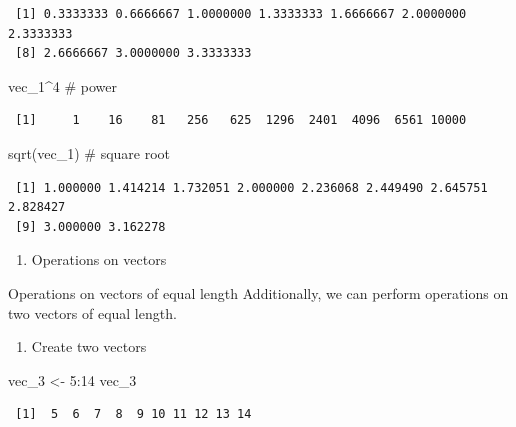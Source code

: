 \documentclass[
  letterpaper,
  DIV=11,
  numbers=noendperiod]{scrreprt}
\newenvironment{Shaded}{\begin{snugshade}}{\end{snugshade}}
\newcommand{\CommentTok}[1]{\textcolor[rgb]{0.37,0.37,0.37}{#1}}
\newcommand{\DecValTok}[1]{\textcolor[rgb]{0.68,0.00,0.00}{#1}}
\newcommand{\FunctionTok}[1]{\textcolor[rgb]{0.28,0.35,0.67}{#1}}
\newcommand{\NormalTok}[1]{\textcolor[rgb]{0.00,0.23,0.31}{#1}}
\newcommand{\OtherTok}[1]{\textcolor[rgb]{0.00,0.23,0.31}{#1}}
\newcommand{\SpecialCharTok}[1]{\textcolor[rgb]{0.37,0.37,0.37}{#1}}
\providecommand{\tightlist}{%
  \setlength{\itemsep}{0pt}\setlength{\parskip}{0pt}}\usepackage{longtable,booktabs,array}
\begin{document}
\begin{verbatim}
 [1] 0.3333333 0.6666667 1.0000000 1.3333333 1.6666667 2.0000000 2.3333333
 [8] 2.6666667 3.0000000 3.3333333
\end{verbatim}

\begin{Shaded}
\begin{Highlighting}[]
\NormalTok{vec\_1}\SpecialCharTok{\^{}}\DecValTok{4} \CommentTok{\# power}
\end{Highlighting}
\end{Shaded}

\begin{verbatim}
 [1]     1    16    81   256   625  1296  2401  4096  6561 10000
\end{verbatim}

\begin{Shaded}
\begin{Highlighting}[]
\FunctionTok{sqrt}\NormalTok{(vec\_1) }\CommentTok{\# square root}
\end{Highlighting}
\end{Shaded}

\begin{verbatim}
 [1] 1.000000 1.414214 1.732051 2.000000 2.236068 2.449490 2.645751 2.828427
 [9] 3.000000 3.162278
\end{verbatim}

\begin{enumerate}
\def\labelenumi{\arabic{enumi}.}
\setcounter{enumi}{1}
\tightlist
\item
  Operations on vectors
\end{enumerate}

Operations on vectors of equal length Additionally, we can perform
operations on two vectors of equal length.

\begin{enumerate}
\def\labelenumi{\alph{enumi}.}
\tightlist
\item
  Create two vectors
\end{enumerate}

\begin{Shaded}
\begin{Highlighting}[]
\NormalTok{vec\_3 }\OtherTok{\textless{}{-}} \DecValTok{5}\SpecialCharTok{:}\DecValTok{14}
\NormalTok{vec\_3}
\end{Highlighting}
\end{Shaded}

\begin{verbatim}
 [1]  5  6  7  8  9 10 11 12 13 14
\end{verbatim}
\end{document}

